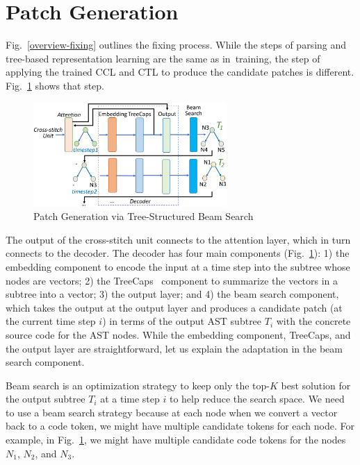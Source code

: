 \section{Patch Generation}
\label{sec:patch-gen}

Fig.~\ref{overview-fixing} outlines the fixing process. While the
steps of parsing and tree-based representation learning are the same
as in~train\-ing, the step of applying the trained CCL and CTL to
produce the candidate patches is different. Fig.~\ref{fig:patch-gen}
shows that step.

\begin{figure}[t]
	\centering
	\includegraphics[width=2.9in]{graphs/beam-search.png}
        \vspace{-3pt}
	\caption{Patch Generation via Tree-Structured Beam Search}
	\label{fig:patch-gen}
\end{figure}

The output of the cross-stitch unit connects to the attention layer,
which in turn connects to the decoder. The decoder has four main
components (Fig.~\ref{fig:patch-gen}): 1) the embedding component to
encode the input at a time step into the subtree whose nodes are
vectors; 2) the TreeCaps~\cite{bui2021treecaps} component to summarize
the vectors in a subtree into a vector; 3) the output layer; and 4)
the beam search component, which takes the output at the output layer
and produces a candidate patch (at the current time step $i$) in terms
of the output AST subtree $T_i$ with the concrete source code for the
AST nodes. While the embedding component, TreeCaps, and the output
layer are straightforward, let us explain the adaptation in the beam
search component.

Beam search is an optimization strategy to keep only the top-$K$ best
solution for the output subtree $T_i$ at a time step $i$ to help
reduce the search space. We need to use a beam search
strategy because at each node when we convert a vector back to a code
token, we might have multiple candidate tokens for each node. For
example, in Fig.~\ref{fig:patch-gen}, we might have multiple
candidate code tokens for the nodes $N_1$, $N_2$, and $N_3$.

